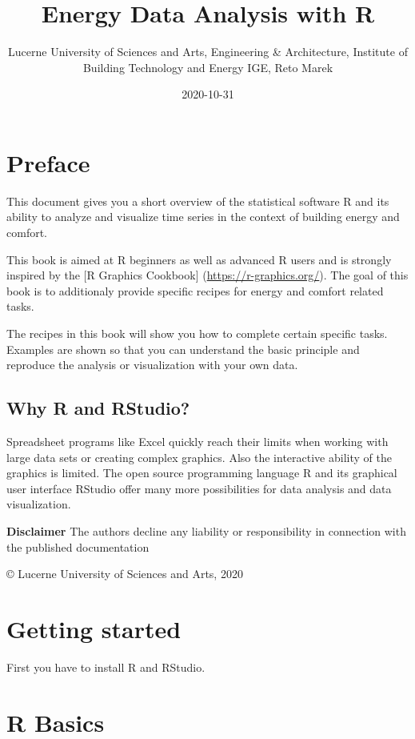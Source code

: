 \documentclass[
]{book}
\title{Energy Data Analysis with R}
\author{Lucerne University of Sciences and Arts, Engineering \& Architecture, Institute of Building Technology and Energy IGE, Reto Marek}
\date{2020-10-31}
\begin{document}
\maketitle

{
\setcounter{tocdepth}{1}
\tableofcontents
}
\hypertarget{preface}{%
\chapter*{Preface}\label{preface}}

This document gives you a short overview of the statistical software R and its ability to analyze and visualize time series in the context of building energy and comfort.

This book is aimed at R beginners as well as advanced R users and is strongly inspired by the {[}R Graphics Cookbook{]} (\url{https://r-graphics.org/}). The goal of this book is to additionaly provide specific recipes for energy and comfort related tasks.

The recipes in this book will show you how to complete certain specific tasks. Examples are shown so that you can understand the basic principle and reproduce the analysis or visualization with your own data.

\hypertarget{why-r-and-rstudio}{%
\section{Why R and RStudio?}\label{why-r-and-rstudio}}

Spreadsheet programs like Excel quickly reach their limits when working with large data sets or creating complex graphics. Also the interactive ability of the graphics is limited. The open source programming language R and its graphical user interface RStudio offer many more possibilities for data analysis and data visualization.

\textbf{Disclaimer}
The authors decline any liability or responsibility in connection with the published documentation

© Lucerne University of Sciences and Arts, 2020

\hypertarget{getting-started}{%
\chapter{Getting started}\label{getting-started}}

First you have to install R and RStudio.

\hypertarget{r-basics}{%
\chapter{R Basics}\label{r-basics}}
\end{document}
